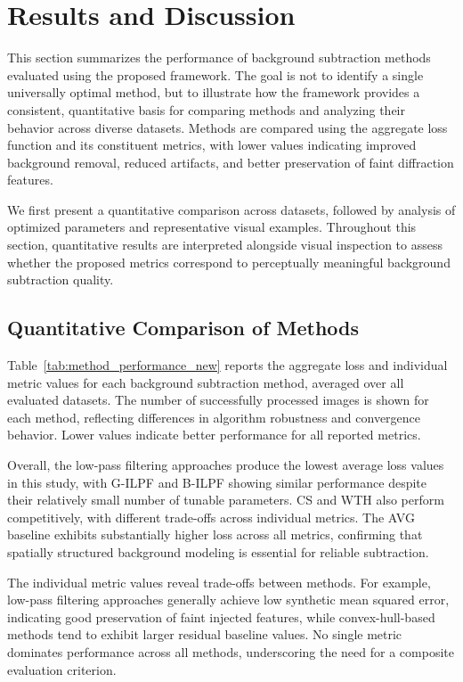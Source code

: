 \documentclass[iucr]{iucrjournals}
\begin{document}
\section{Results and Discussion}

This section summarizes the performance of background subtraction methods evaluated using the proposed framework. The goal is not to identify a single universally optimal method, but to illustrate how the framework provides a consistent, quantitative basis for comparing methods and analyzing their behavior across diverse datasets. Methods are compared using the aggregate loss function and its constituent metrics, with lower values indicating improved background removal, reduced artifacts, and better preservation of faint diffraction features.

We first present a quantitative comparison across datasets, followed by analysis of optimized parameters and representative visual examples. Throughout this section, quantitative results are interpreted alongside visual inspection to assess whether the proposed metrics correspond to perceptually meaningful background subtraction quality.

\subsection{Quantitative Comparison of Methods}

Table~\ref{tab:method_performance_new} reports the aggregate loss and individual metric values for each background subtraction method, averaged over all evaluated datasets. The number of successfully processed images is shown for each method, reflecting differences in algorithm robustness and convergence behavior. Lower values indicate better performance for all reported metrics.

Overall, the low-pass filtering approaches produce the lowest average loss values in this study, with G-ILPF and B-ILPF showing similar performance despite their relatively small number of tunable parameters. CS and WTH also perform competitively, with different trade-offs across individual metrics. The AVG baseline exhibits substantially higher loss across all metrics, confirming that spatially structured background modeling is essential for reliable subtraction.

The individual metric values reveal trade-offs between methods. For example, low-pass filtering approaches generally achieve low synthetic mean squared error, indicating good preservation of faint injected features, while convex-hull-based methods tend to exhibit larger residual baseline values. No single metric dominates performance across all methods, underscoring the need for a composite evaluation criterion.
\end{document}
